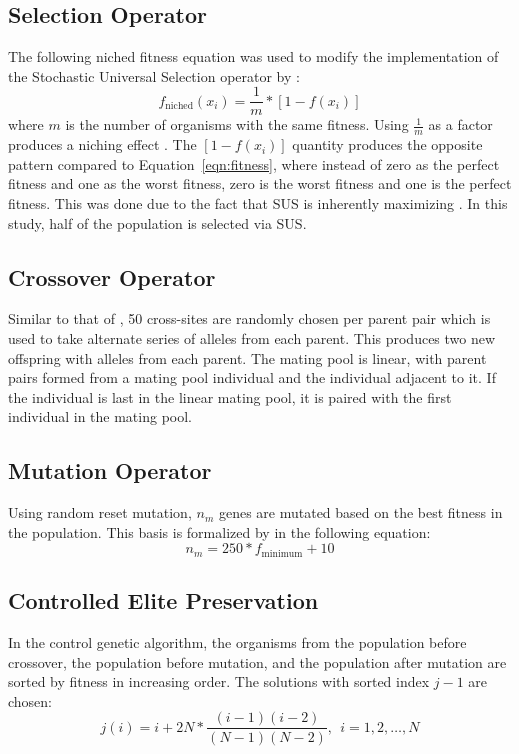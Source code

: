 \documentclass{strrespaper-journ}
\begin{document}
		\subsection{Selection Operator}
			The following niched fitness equation \autocite{bhattSearchNolossStrategies2008} was used to modify the implementation of the Stochastic Universal Selection operator by \textcite{panchapakesanStochasticUniversalSampling2014}:
			\begin{equation*}
				f_\mathrm{niched}(x_i) = \frac{1}{m} * [1 - f(x_i)]
			\end{equation*}
			where $m$ is the number of organisms with the same fitness.
			Using $\frac{1}{m}$ as a factor produces a niching effect \autocite{bhattSearchNolossStrategies2008}.
			The $[1 - f(x_i)]$ quantity produces the opposite pattern compared to Equation~\ref{eqn:fitness}, where instead of zero as the perfect fitness and one as the worst fitness, zero is the worst fitness and one is the perfect fitness.
			This was done due to the fact that SUS is inherently maximizing \autocite{bhattSearchNolossStrategies2008}.
			In this study, half of the population is selected via SUS.

		\subsection{Crossover Operator}
			Similar to that of \textcite{bhattSearchNolossStrategies2008}, 50 cross-sites are randomly chosen per parent pair which is used to take alternate series of alleles from each parent.
			This produces two new offspring with alleles from each parent.
			The mating pool is linear, with parent pairs formed from a mating pool individual and the individual adjacent to it.
			If the individual is last in the linear mating pool, it is paired with the first individual in the mating pool.

		\subsection{Mutation Operator}
			Using random reset mutation, $n_m$ genes are mutated based on the best fitness in the population.
			This basis is formalized by \textcite{bhattSearchNolossStrategies2008} in the following equation:
			\begin{equation*}
				n_m = 250 * f_\mathrm{minimum} + 10
			\end{equation*}

		\subsection{Controlled Elite Preservation}
			In the control genetic algorithm, the organisms from the population before crossover, the population before mutation, and the population after mutation are sorted by fitness in increasing order.
			The solutions with sorted index $j - 1$ are chosen:
			\begin{equation*}
				j(i) = i + 2N * \frac{(i - 1)(i - 2)}{(N - 1)(N - 2)},~~i = 1, 2, \dots, N
			\end{equation*}
\end{document}
